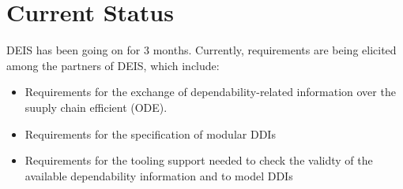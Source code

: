 \section{Current Status}
DEIS has been going on for 3 months. Currently, requirements are being elicited among the partners of DEIS, which include:
\begin{itemize}
	\item Requirements for the exchange of dependability-related information over the suuply chain efficient (ODE).
	\item Requirements for the specification of modular DDIs
	\item Requirements for the tooling support needed to check the validty of the available dependability information and to model DDIs
\end{itemize}
